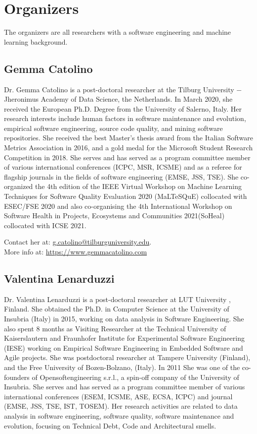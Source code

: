
\section{Organizers}

The organizers are all researchers with a software engineering and machine learning background.

\label{sec:organizers}
\subsection{Gemma Catolino}
Dr. Gemma Catolino is a post-doctoral researcher at the Tilburg University $-$ Jheronimus Academy of Data Science, the Netherlands.
In March 2020, she received the European Ph.D. Degree from the University of Salerno, Italy. Her research interests include human factors in software maintenance and evolution, empirical software engineering, source code quality, and mining software repositories.
She received the best Master's thesis award from the Italian Software Metrics Association in 2016, and a gold medal for the Microsoft Student Research Competition in 2018. She serves and has served as a program committee member of various international conferences (ICPC, MSR, ICSME) and as a referee for flagship journals in the fields of software engineering (EMSE, JSS, TSE). She co-organized the 4th edition of the IEEE Virtual Workshop on Machine Learning Techniques for Software Quality Evaluation 2020 (MaLTeSQuE) collocated with ESEC/FSE 2020 and also co-organising the 4th International Workshop on Software Health in Projects, Ecosystems and Communities 2021(SoHeal) collocated with ICSE 2021.

\smallskip
\noindent Contact her at: \href{mailto:g.catolino@tilburguniversity.edu}{g.catolino@tilburguniversity.edu}.\\
More info at: \url{https://www.gemmacatolino.com}

\subsection{Valentina Lenarduzzi}
Dr. Valentina Lenarduzzi is a post-doctoral researcher at LUT University , Finland. 
She obtained the Ph.D. in Computer Science at the University of Insubria (Italy) in 2015, working on data analysis in Software Engineering. She also spent 8 months as Visiting Researcher at the Technical University of Kaiserslautern and Fraunhofer Institute for Experimental Software Engineering (IESE) working on Empirical Software Engineering in Embedded Software and Agile projects.
She was postdoctoral researcher at Tampere University (Finland), and the Free University of Bozen-Bolzano, (Italy). In 2011 She was one of the co-founders of Opensoftengineering s.r.l., a spin-off company of the University of Insubria. She serves and has served as a program committee member of various international conferences (ESEM, ICSME, ASE, ECSA, ICPC) and journal (EMSE, JSS, TSE, IST, TOSEM).
Her research activities are related to data analysis in software engineering, software quality, software maintenance and evolution, focusing on Technical Debt, Code and Architectural smells. 

